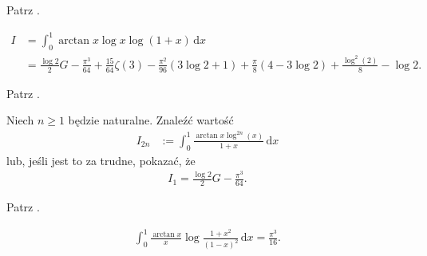 
\begin{solution}
    Patrz \cite[s. 13]{valean19}.
\end{solution}


\begin{problem_with_solution}
    \label{valean_1_23}%
    \begin{align}
        I & = \int_0^1 \arctan x \log x \log (1 + x) \,\mathrm{d}x \\
        & = \frac{\log 2}{2} G - \frac{\pi^3}{64} + \frac{15}{64} \zeta(3) - \frac{\pi^2}{96} (3 \log 2 + 1) + \frac{\pi} {8} (4-3 \log 2) + \frac{\log^2(2)}{8} - \log 2.
    \end{align} 
\end{problem_with_solution}


\begin{solution}
    Patrz \cite[s. 13, 14]{valean19}.
\end{solution}



\begin{problem_with_solution}
    \label{valean_1_24}%
    Niech $n \ge 1$ będzie naturalne.
    Znaleźć wartość
    \begin{align}
        I_{2n} & := \int_0^1 \frac {\arctan x \log^{2n} (x)}{1 + x } \,\mathrm{d}x
    \end{align} 
    lub, jeśli jest to za trudne, pokazać, że 
    \begin{align}
        I_{1} = \frac{\log 2}{2}G - \frac{\pi^3}{64}.
    \end{align} 
\end{problem_with_solution}


\begin{solution}
    Patrz \cite[s. 14, 15]{valean19}.
\end{solution}


\begin{problem_with_solution}
    \label{valean_1_26}%
    \begin{align}
        \int_0^1 \frac{\arctan x}{x} \log \frac{1+x^2}{(1-x)^2} \,\mathrm{d}x = \frac{\pi^3}{16}.
    \end{align} 
\end{problem_with_solution}

